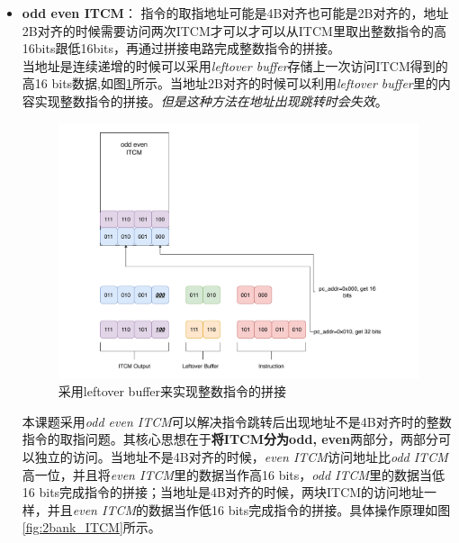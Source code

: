 \documentclass[a4paper, 12pt]{article}
\begin{document}
\begin{itemize}
  \item \textbf{odd even ITCM}：
    指令的取指地址可能是4B对齐也可能是2B对齐的，地址2B对齐的时候需要访问两次ITCM才可以才可以从ITCM里取出整数指令的高16bits跟低16bits，再通过拼接电路完成整数指令的拼接。\\ 
    当地址是连续递增的时候可以采用\textit{leftover buffer}存储上一次访问ITCM得到的高16 bits数据,如图\ref{fig:if_leftover_buffer}所示。当地址2B对齐的时候可以利用\textit{leftover buffer}里的内容实现整数指令的拼接。\textit{但是这种方法在地址出现跳转时会失效}。
    \begin{figure}[htbp]
      \centering
      \includegraphics[width=0.8\linewidth]{./images/if_leftover_buffer.pdf}
      \caption{采用leftover buffer来实现整数指令的拼接}
      \label{fig:if_leftover_buffer}
    \end{figure}
    本课题采用\textit{odd even ITCM}可以解决指令跳转后出现地址不是4B对齐时的整数指令的取指问题。其核心思想在于\textbf{将ITCM分为odd, even}两部分，两部分可以独立的访问。当地址不是4B对齐的时候，\textit{even ITCM}访问地址比\textit{odd ITCM}高一位，并且将\textit{even ITCM}里的数据当作高16 bits，\textit{odd ITCM}里的数据当低16 bits完成指令的拼接；当地址是4B对齐的时候，两块ITCM的访问地址一样，并且\textit{even ITCM}的数据当作低16 bits完成指令的拼接。具体操作原理如图\ref{fig:2bank_ITCM}所示。


\end{itemize}
\end{document}
